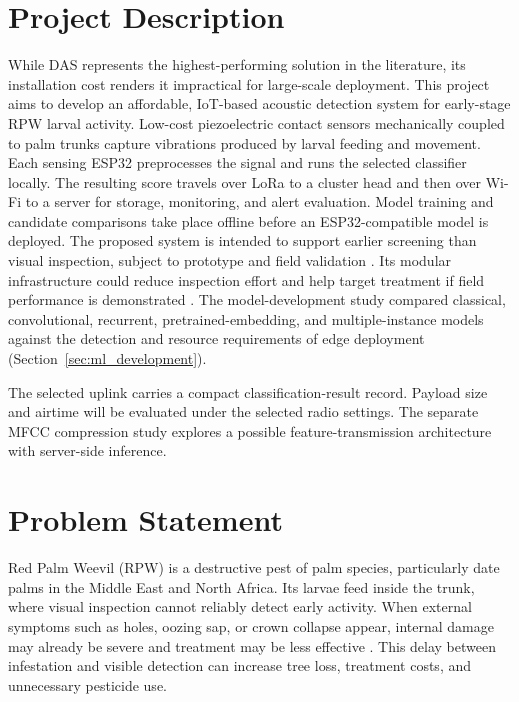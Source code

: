 \documentclass[12pt,a4paper,oneside]{memoir}
\newcommand{\earlierrevision}[1]{#1}
\newcommand{\newrevision}[1]{#1}
\begin{document}
 
 
\section{Project Description}
\label{sec:Description}
 
\newrevision{While DAS represents the highest-performing solution in the literature, its installation cost renders it impractical for large-scale deployment. This project aims to develop an affordable, IoT-based acoustic detection system for early-stage RPW larval activity. Low-cost piezoelectric contact sensors mechanically coupled to palm trunks capture vibrations produced by larval feeding and movement. Each sensing ESP32 preprocesses the signal and runs the selected classifier locally. The resulting score travels over LoRa to a cluster head and then over Wi-Fi to a server for storage, monitoring, and alert evaluation. Model training and candidate comparisons take place offline before an ESP32-compatible model is deployed. The proposed system is intended to support earlier screening than visual inspection, subject to prototype and field validation \cite{ashry2020,ashry2022cnn,karar2022}. Its modular infrastructure could reduce inspection effort and help target treatment if field performance is demonstrated \cite{saleem2022,karar2022}. The model-development study compared classical, convolutional, recurrent, pretrained-embedding, and multiple-instance models against the detection and resource requirements of edge deployment (Section~\ref{sec:ml_development}).}

\newrevision{The selected uplink carries a compact classification-result record. Payload size and airtime will be evaluated under the selected radio settings. The separate MFCC compression study explores a possible feature-transmission architecture with server-side inference.}
 
\section{Problem Statement}
\label{sec:Statement}
 
\earlierrevision{Red Palm Weevil (RPW) is a destructive pest of palm species, particularly date palms in the Middle East and North Africa. Its larvae feed inside the trunk, where visual inspection cannot reliably detect early activity. When external symptoms such as holes, oozing sap, or crown collapse appear, internal damage may already be severe and treatment may be less effective \cite{saleem2022,ashry2022cnn}. This delay between infestation and visible detection can increase tree loss, treatment costs, and unnecessary pesticide use.}
 
\end{document}
